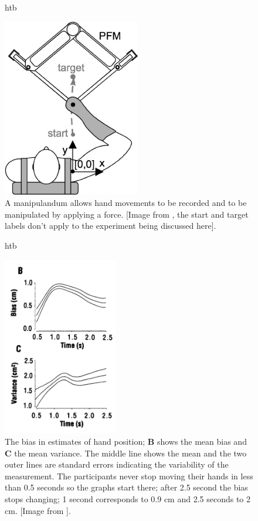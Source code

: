 \documentclass[12pt]{article}
\begin{document}
\begin{figure}{htb}
\begin{center}
  \includegraphics[width=6cm]{manipulandum.jpg}
\end{center}
\caption{A manipulandum allows hand movements to be recorded and to be
  manipulated by applying a force. [Image from \cite{MistryEt2013},
    the start and target labels don't apply to the experiment being
    discussed here].\label{fig_manipulandum}}
\end{figure}


\begin{figure}{htb}
\begin{center}
  \includegraphics[width=5cm]{fig_overestimate.png}
\end{center}
\caption{The bias in estimates of hand position; \textbf{B} shows the
  mean bias and \textbf{C} the mean variance. The middle line shows
  the mean and the two outer lines are standard errors indicating the
  variability of the measurement. The participants never stop moving
  their hands in less than 0.5 seconds so the graphs start there;
  after 2.5 second the bias stops changing; 1 second corresponds to
  0.9 cm and 2.5 seconds to 2 cm. [Image from
    \cite{WolpertEtAl1995}].\label{fig_manipulandum}}
\end{figure}
\end{document}
